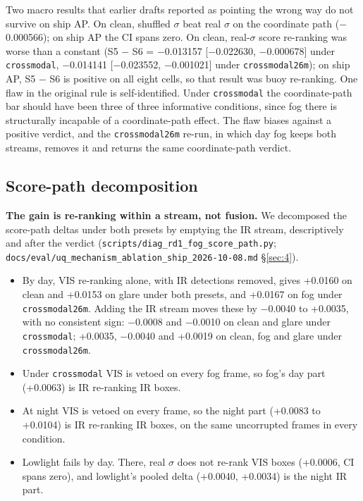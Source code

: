 \documentclass[10pt]{article}
\begin{document}
Two macro results that earlier drafts reported as pointing the wrong way do not survive on ship AP. On clean, shuffled $\sigma$ beat real $\sigma$ on the coordinate path ($-$0.000566); on ship AP the CI spans zero. On clean, real-$\sigma$ score re-ranking was worse than a constant (S5 $-$ S6 = $-$0.013157 [$-$0.022630, $-$0.000678] under \texttt{crossmodal}, $-$0.014141 [$-$0.023552, $-$0.001021] under \texttt{crossmodal26m}); on ship AP, S5 $-$ S6 is positive on all eight cells, so that result was buoy re-ranking. One flaw in the original rule is self-identified. Under \texttt{crossmodal} the coordinate-path bar should have been three of three informative conditions, since fog there is structurally incapable of a coordinate-path effect. The flaw biases against a positive verdict, and the \texttt{crossmodal26m} re-run, in which day fog keeps both streams, removes it and returns the same coordinate-path verdict.

\subsection{Score-path decomposition}\label{app:H.2}
\textbf{The gain is re-ranking within a stream, not fusion.} We decomposed the score-path deltas under both presets by emptying the IR stream, descriptively and after the verdict (\texttt{scripts/\allowbreak{}diag\_\allowbreak{}rd1\_\allowbreak{}fog\_\allowbreak{}score\_\allowbreak{}path.py}; \texttt{docs/\allowbreak{}eval/\allowbreak{}uq\_\allowbreak{}mechanism\_\allowbreak{}ablation\_\allowbreak{}ship\_\allowbreak{}2026-10-08.md} \S\ref{sec:4}).
\begin{itemize}
\item By day, VIS re-ranking alone, with IR detections removed, gives +0.0160 on clean and +0.0153 on glare under both presets, and +0.0167 on fog under \texttt{crossmodal26m}. Adding the IR stream moves these by $-$0.0040 to +0.0035, with no consistent sign: $-$0.0008 and $-$0.0010 on clean and glare under \texttt{crossmodal}; +0.0035, $-$0.0040 and +0.0019 on clean, fog and glare under \texttt{crossmodal26m}.
\item Under \texttt{crossmodal} VIS is vetoed on every fog frame, so fog's day part (+0.0063) is IR re-ranking IR boxes.
\item At night VIS is vetoed on every frame, so the night part (+0.0083 to +0.0104) is IR re-ranking IR boxes, on the same uncorrupted frames in every condition.
\item Lowlight fails by day. There, real $\sigma$ does not re-rank VIS boxes (+0.0006, CI spans zero), and lowlight's pooled delta (+0.0040, +0.0034) is the night IR part.
\end{itemize}
\end{document}

